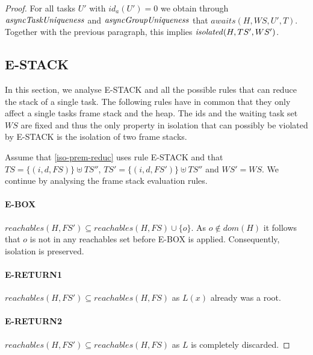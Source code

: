 \begin{proof}
For all tasks $U'$ with $id_a(U') = 0$ we obtain through $\mathop{\mathit{asyncTaskUniqueness}}$ and $\mathop{\mathit{asyncGroupUniqueness}}$ that $awaits(H, WS, U', T)$. Together with the previous paragraph, this implies $\mathop{\mathit{isolated}}(H, TS', WS')$.

\subsection{E-STACK}
In this section, we analyse E-STACK and all the possible rules that can reduce the stack of a single task. The following rules have in common that they only affect a single tasks frame stack and the heap. The ids and the waiting task set $WS$ are fixed and thus the only property in isolation that can possibly be violated by E-STACK is the isolation of two frame stacks.

Assume that \cref{iso-prem-reduc} uses rule E-STACK and that $TS = \{ (i, d, FS) \} \uplus TS''$, $TS' = \{ (i, d, FS') \} \uplus TS''$ and $WS' = WS$. We continue by analysing the frame stack evaluation rules.


\paragraph{E-BOX}
$reachables(H, FS') \subseteq reachables(H, FS) \cup \{o\}$. As $o \not \in dom(H)$ it follows that $o$ is not in any reachables set before E-BOX is applied. Consequently, isolation is preserved.

\paragraph{E-RETURN1}
$reachables(H, FS') \subseteq reachables(H, FS)$ as $L(x)$ already was a root.

\paragraph{E-RETURN2}
$reachables(H, FS') \subseteq reachables(H, FS)$ as $L$ is completely discarded.


\end{proof}
